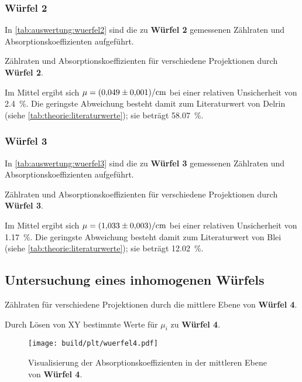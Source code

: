 \subsubsection{\textbf{Würfel 2}}
In \autoref{tab:auswertung:wuerfel2} sind die zu \textbf{Würfel 2} gemessenen Zählraten und Absorptionskoeffizienten aufgeführt.
\begin{table}[H]
    \centering
    \caption{Zählraten und Absorptionskoeffizienten für verschiedene Projektionen durch \textbf{Würfel 2}.}
    \label{tab:auswertung:wuerfel2}
\end{table}
Im Mittel ergibt sich $\mu = \SI{0.049 \pm 0.001}{\per\centi\meter}$
bei einer relativen Unsicherheit von \SI{2.4}{\percent}.
Die geringste Abweichung besteht damit zum Literaturwert von Delrin (siehe \autoref{tab:theorie:literaturwerte});
sie beträgt \SI{58.07}{\percent}.


\subsubsection{\textbf{Würfel 3}}
In \autoref{tab:auswertung:wuerfel3} sind die zu \textbf{Würfel 3} gemessenen Zählraten und Absorptionskoeffizienten aufgeführt.
\begin{table}[H]
    \centering
    \caption{Zählraten und Absorptionskoeffizienten für verschiedene Projektionen durch \textbf{Würfel 3}.}
    \label{tab:auswertung:wuerfel3}
\end{table}
Im Mittel ergibt sich $\mu = \SI{1.033 \pm 0.003}{\per\centi\meter}$
bei einer relativen Unsicherheit von \SI{1.17}{\percent}.
Die geringste Abweichung besteht damit zum Literaturwert von Blei (siehe \autoref{tab:theorie:literaturwerte});
sie beträgt \SI{12.02}{\percent}.


\subsection{Untersuchung eines inhomogenen Würfels}

\begin{table}[H]
    \centering
    \caption{Zählraten für verschiedene Projektionen durch die mittlere Ebene von \textbf{Würfel 4}.}
    \label{tab:auswertung:wuerfel4}
\end{table}

\begin{table}[H]
    \centering
    \caption{Durch Lösen von XY bestimmte Werte für $\mu_i$ zu \textbf{Würfel 4}.}
    \label{tab:auswertung:wuerfel4_mu}
\end{table}

\begin{figure}
    \centering
    \texttt{[image: build/plt/wuerfel4.pdf]}
    \caption{Visualisierung der Absorptionskoeffizienten in der mittleren Ebene von \textbf{Würfel 4}.}
    \label{plt:auswertung:wuerfel4}
\end{figure}
